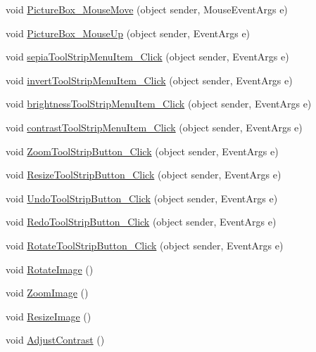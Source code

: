 \begin{DoxyCompactItemize}
\item 
void \hyperlink{class_u_i_1_1_shopped_gui_a3e9438c31f65604189c8fa3819bb0510}{PictureBox\_\-MouseMove} (object sender, MouseEventArgs e)
\item 
void \hyperlink{class_u_i_1_1_shopped_gui_a24f789e7efcce9caf5178012245a75fc}{PictureBox\_\-MouseUp} (object sender, EventArgs e)
\item 
void \hyperlink{class_u_i_1_1_shopped_gui_a533354a0b2f7d07821793de2faca3e9e}{sepiaToolStripMenuItem\_\-Click} (object sender, EventArgs e)
\item 
void \hyperlink{class_u_i_1_1_shopped_gui_a4b427f671412d87998b2ee692188e038}{invertToolStripMenuItem\_\-Click} (object sender, EventArgs e)
\item 
void \hyperlink{class_u_i_1_1_shopped_gui_af34ff2a7d4362d8b1ad623584997ef64}{brightnessToolStripMenuItem\_\-Click} (object sender, EventArgs e)
\item 
void \hyperlink{class_u_i_1_1_shopped_gui_abbc4b01527f315dce800b0db4a1b4677}{contrastToolStripMenuItem\_\-Click} (object sender, EventArgs e)
\item 
void \hyperlink{class_u_i_1_1_shopped_gui_adae47cccd54dffb1caba9b7226e93fd1}{ZoomToolStripButton\_\-Click} (object sender, EventArgs e)
\item 
void \hyperlink{class_u_i_1_1_shopped_gui_aa7a084a294a53c365db6ff2819c41ca4}{ResizeToolStripButton\_\-Click} (object sender, EventArgs e)
\item 
void \hyperlink{class_u_i_1_1_shopped_gui_a78f013b1629cf758caec6e07e8694988}{UndoToolStripButton\_\-Click} (object sender, EventArgs e)
\item 
void \hyperlink{class_u_i_1_1_shopped_gui_a1b0a305e8263bd20d979d2d0b04c726b}{RedoToolStripButton\_\-Click} (object sender, EventArgs e)
\item 
void \hyperlink{class_u_i_1_1_shopped_gui_ab00cf3db4aed9cacee4e7d5ff261509b}{RotateToolStripButton\_\-Click} (object sender, EventArgs e)
\item 
void \hyperlink{class_u_i_1_1_shopped_gui_a5558e1154a550f8a8717a4e6240c0614}{RotateImage} ()
\item 
void \hyperlink{class_u_i_1_1_shopped_gui_a12f67f7b5543dec9779eaac2f8948111}{ZoomImage} ()
\item 
void \hyperlink{class_u_i_1_1_shopped_gui_a17f56127994db9ab942c65baf3506172}{ResizeImage} ()
\item 
void \hyperlink{class_u_i_1_1_shopped_gui_a61ec62f5b9069ad0694aac24efacb901}{AdjustContrast} ()
\item 

\end{DoxyCompactItemize}
